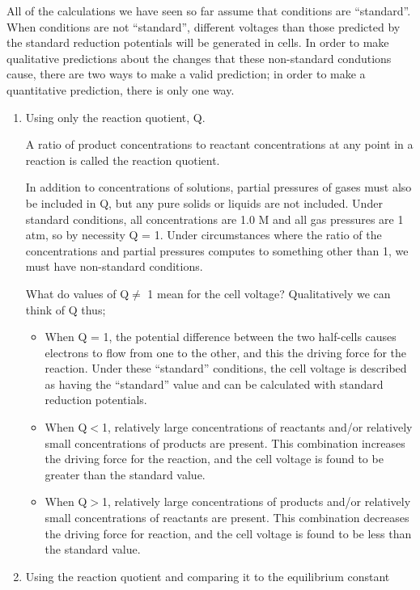 \documentclass[../chem.tex]{subfiles}
\begin{document}
All of the calculations we have seen so far assume that conditions are ``standard''. When conditions are not ``standard'', different voltages than 
those predicted by the standard reduction potentials will be generated in cells. In order to make qualitative predictions about the changes that these 
non-standard condutions cause, there are two ways to make a valid prediction; in order to make a quantitative prediction, there is only one way.
\begin{enumerate}
    \item Using only the reaction quotient, Q.
    
    A ratio of product concentrations to reactant concentrations at any point in a reaction is called the reaction quotient.

    In addition to concentrations of solutions, partial pressures of gases must also be included in Q, but any pure solids or liquids are not included.
    Under standard conditions, all concentrations are 1.0 M and all gas pressures are 1 atm, so by necessity Q = 1. Under circumstances where the ratio of the 
    concentrations and partial pressures computes to something other than 1, we must have non-standard conditions. 

    What do values of Q$\neq$ 1 mean for the cell voltage? Qualitatively we can think of Q thus; 
    \begin{itemize}
        \item When Q = 1, the potential difference between the two half-cells causes electrons to flow from one to the other, and this the driving force for the reaction.
        Under these ``standard'' conditions, the cell voltage is described as having the ``standard'' value and can be calculated with standard reduction potentials.
        \item When Q$<$1, relatively large concentrations of reactants and/or relatively small concentrations of products are present. This combination increases the driving force for the reaction, and the cell voltage is found to be greater than the standard value.
        \item When Q$>$1, relatively large concentrations of products and/or relatively small concentrations of reactants are present. This combination decreases the driving force for reaction, and the cell voltage is found to be less than the standard value.
    \end{itemize}

    \item Using the reaction quotient and comparing it to the equilibrium constant 
    

\end{enumerate}
\end{document}
